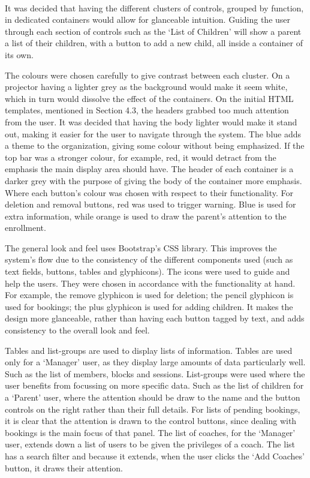 \documentclass{l3proj}
\begin{document}
\\
\par It was decided that having the different clusters of controls, grouped by function, in dedicated containers would allow for glanceable intuition. Guiding the user through each section of controls such as the `List of Children' will show a parent a list of their children, with a button to add a new child, all inside a container of its own.\\
\par The colours were chosen carefully to give contrast between each cluster. On a projector having a lighter grey as the background would make it seem white, which in turn would dissolve the effect of the containers. On the initial HTML templates, mentioned in Section 4.3, the headers grabbed too much attention from the user. It was decided that having the body lighter would make it stand out, making it easier for the user to navigate through the system. The blue adds a theme to the organization, giving some colour without being emphasized. If the top bar was a stronger colour,  for example, red, it would detract from the emphasis the main display area should have. The header of each container is a darker grey with the purpose of giving the body of the container more emphasis. Where each button’s colour was chosen with respect to their functionality. For deletion and removal buttons, red was used to trigger warning. Blue is used for extra information, while orange is used to draw the parent’s attention to the enrollment. \\
\par The general look and feel uses Bootstrap's CSS library. This improves the system's flow due to the consistency of the different components used (such as text fields, buttons, tables and glyphicons). The icons were used to guide and help the users. They were chosen in accordance with the functionality at hand. For example, the remove glyphicon is used for deletion; the pencil glyphicon is used for bookings; the plus glyphicon is used for adding children. It makes the design more glanceable, rather than having each button tagged by text, and adds consistency to the overall look and feel.\\
\par Tables and list-groups are used to display lists of information. Tables are used only for a `Manager' user, as they display large amounts of data particularly well. Such as the list of members, blocks and sessions. List-groups were used where the user benefits from focussing on more specific data. Such as the list of children for a `Parent' user, where the attention should be draw to the name and the button controls on the right rather than their full details. For lists of pending bookings, it is clear that the attention is drawn to the control buttons, since dealing with bookings is the main focus of that panel. The list of coaches, for the `Manager' user, extends down a list of users to be given the privileges of a coach. The list has a search filter and because it extends, when the user clicks the `Add Coaches' button, it draws their attention.
\end{document}
